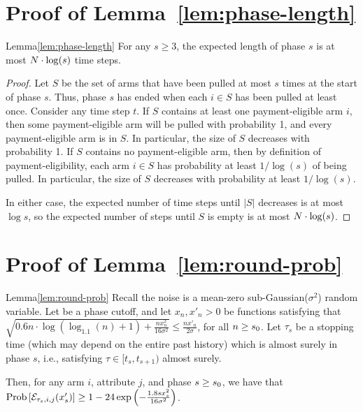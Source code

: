 \section{Proof of Lemma~\ref{lem:phase-length}}
\label{sec:lemma4-proof}

\begin{rlemma}{Lemma}{\ref{lem:phase-length}}
For any $s\geq 3$, the expected length of phase $s$ is at most
$N \cdot \log(s)$ time steps.
\end{rlemma}

\begin{proof}
Let $S$ be the set of arms that have been pulled at most
$s$ times at the start of phase $s$.
Thus, phase $s$ has ended when each $i \in S$ has been pulled at least once.
Consider any time step $t$.
If $S$ contains at least one payment-eligible arm $i$,
then some payment-eligible arm will be pulled with probability 1,
and every payment-eligible arm is in $S$.
In particular, the size of $S$ decreases with probability 1.
If $S$ contains no payment-eligible arm,
then by definition of payment-eligibility,
each arm $i \in S$ has probability at least $1/\log(s)$ of being pulled.
In particular, the size of $S$ decreases with probability at least $1/\log(s)$.

In either case, the expected number of time steps until
$|S|$ decreases is at most $\log s$,
so the expected number of steps until $S$ is empty is at most
$N \cdot \log(s)$.
\end{proof}







\section{Proof of Lemma~\ref{lem:round-prob}}
\label{sec:lemma5-proof}

\begin{rlemma}{Lemma}{\ref{lem:round-prob}}
Recall the noise is a mean-zero sub-Gaussian($\sigma^2$) random variable.
Let \LatePhase be a phase cutoff, 
and let $x_n, x'_n > 0$ be functions satisfying that
$\sqrt{0.6 n \cdot \log (\log_{1.1}(n) + 1) + \frac{n x_n^2}{16 \sigma^2}}
\leq \frac{n x'_n}{2 \sigma}$,
for all $n \geq s_0$.
Let $\tau_s$ be a stopping time
(which may depend on the entire past history)
which is almost surely in phase $s$,
i.e., satisfying $\tau \in [t_s, t_{s+1})$ almost surely.

Then, for any arm $i$, attribute $j$, and phase $s \geq s_0$,
we have that
$\Prob{\AccE{\tau_s}{i}{j}{x'_s}}
\geq 1 - 24 \exp\left(-\frac{1.8 s x_s^2}{16 \sigma^2} \right)$.
\end{rlemma}

